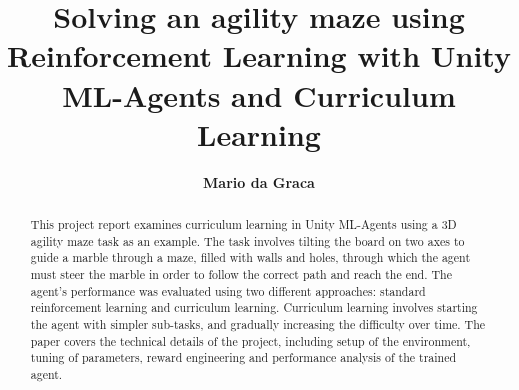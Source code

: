 \documentclass[runningheads]{llncs}
\begin{document}
%
    \title{Solving an agility maze using Reinforcement Learning with Unity ML-Agents and Curriculum Learning}
%
%
    \author{\textbf{Mario da Graca}}
%
%
%
    \maketitle              %
%
    \begin{abstract}
        This project report examines curriculum learning in Unity ML-Agents using a 3D agility maze task as an example.
        The task involves tilting the board on two axes to guide a marble through a maze, filled with walls and holes, through which the agent must steer the marble in order to follow the correct path and reach the end.
        The agent's performance was evaluated using two different approaches: standard reinforcement learning and curriculum learning.
        Curriculum learning involves starting the agent with simpler sub-tasks, and gradually increasing the difficulty over time.
        The paper covers the technical details of the project, including setup of the environment, tuning of parameters, reward engineering and performance analysis of the trained agent.

    \end{abstract}

    

    


    \clearpage
    
    
%
\end{document}
